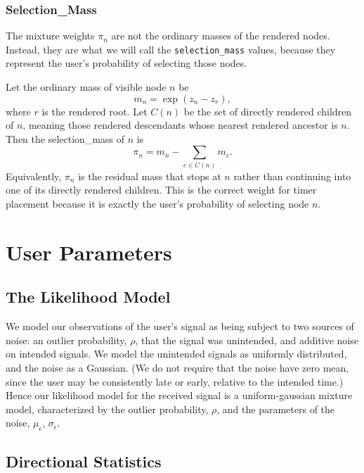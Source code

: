 \subsubsection{Selection\_Mass}
The mixture weights $\pi_n$ are not the ordinary masses of the rendered nodes.
Instead, they are what we will call the \texttt{selection\_mass} values, because
they represent the user's probability of selecting those nodes.

Let the ordinary mass of visible node $n$ be
$$
m_n = \exp(z_n - z_r),
$$
where $r$ is the rendered root. Let $C(n)$ be the set of directly rendered
children of $n$, meaning those rendered descendants whose nearest rendered
ancestor is $n$. Then the selection\_mass of $n$ is
$$
\pi_n = m_n - \sum_{c \in C(n)} m_c.
$$
Equivalently, $\pi_n$ is the residual mass that stops at $n$ rather than
continuing into one of its directly rendered children. This is the correct
weight for timer placement because it is exactly the user's probability of
selecting node $n$.

\section{User Parameters}
\subsection{The Likelihood Model}
We model our observations of the user's signal as being subject to two sources of noise: an outlier probability, $\rho$,
that the signal was unintended, and additive noise on intended signals.
We model the unintended signals as uniformly distributed, and the noise as a Gaussian. (We do not require that the noise have
zero mean, since the user may be consistently late or early, relative to the intended time.) Hence our likelihood model for the
received signal is a uniform-gaussian mixture model, characterized by the outlier probability, 
$\rho$, and the parameters of the noise, $\mu_\epsilon$, $\sigma_\epsilon$.

\subsection{Directional Statistics}



